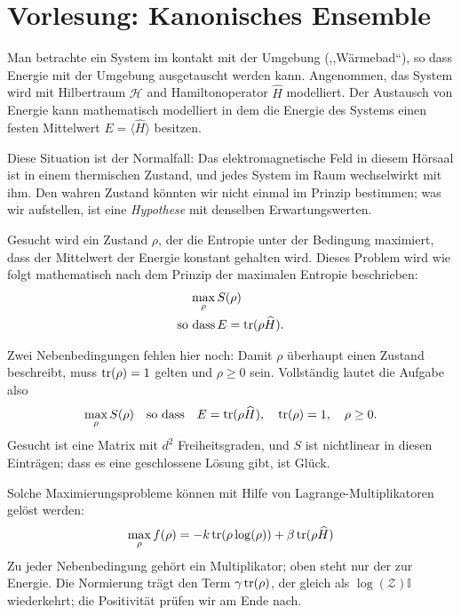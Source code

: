 

\section{Vorlesung: Kanonisches Ensemble}
Man betrachte ein System im kontakt mit der Umgebung (,,Wärmebad``), so dass Energie mit der Umgebung ausgetauscht werden kann. Angenommen, das System wird mit Hilbertraum $\mathcal{H}$ and Hamiltonoperator $\widehat{H}$ modelliert. Der Austausch von Energie kann mathematisch modelliert in dem die Energie des Systems einen festen Mittelwert $E = \langle \widehat{H}\rangle$ besitzen.

Diese Situation ist der Normalfall: Das elektromagnetische Feld in diesem Hörsaal ist in einem thermischen Zustand, und jedes System im Raum wechselwirkt mit ihm. Den wahren Zustand könnten wir nicht einmal im Prinzip bestimmen; was wir aufstellen, ist eine \emph{Hypothese} mit denselben Erwartungswerten.

Gesucht wird ein Zustand $\rho$, der die Entropie unter der Bedingung maximiert, dass der Mittelwert der Energie konstant gehalten wird. Dieses Problem wird wie folgt mathematisch nach dem Prinzip der maximalen Entropie beschrieben:
\begin{equation}
	\begin{split}
		\max_{\rho} &\,S(\rho) \\
		\text{so dass} &\, E=\operatorname{tr}(\rho \widehat{H}).
	\end{split}
\end{equation}

Zwei Nebenbedingungen fehlen hier noch: Damit $\rho$ überhaupt einen Zustand beschreibt, muss $\operatorname{tr}(\rho)=1$ gelten und $\rho \ge 0$ sein. Vollständig lautet die Aufgabe also
\begin{equation}
	\max_{\rho} S(\rho) \quad\text{so dass}\quad E=\operatorname{tr}(\rho \widehat{H}),\quad \operatorname{tr}(\rho)=1,\quad \rho\ge 0.
\end{equation}
Gesucht ist eine Matrix mit $d^2$ Freiheitsgraden, und $S$ ist nichtlinear in diesen Einträgen; dass es eine geschlossene Lösung gibt, ist Glück.

Solche Maximierungsprobleme können mit Hilfe von Lagrange-Multiplikatoren gelöst werden: 
\begin{equation}
	\max_{\rho} f(\rho) = -k\operatorname{tr}(\rho\log(\rho)) + \beta \operatorname{tr}(\rho \widehat{H})
\end{equation}
Zu jeder Nebenbedingung gehört ein Multiplikator; oben steht nur der zur Energie. Die Normierung trägt den Term $\gamma\operatorname{tr}(\rho)$, der gleich als $\log(\mathcal{Z})\mathbb{I}$ wiederkehrt; die Positivität prüfen wir am Ende nach.

